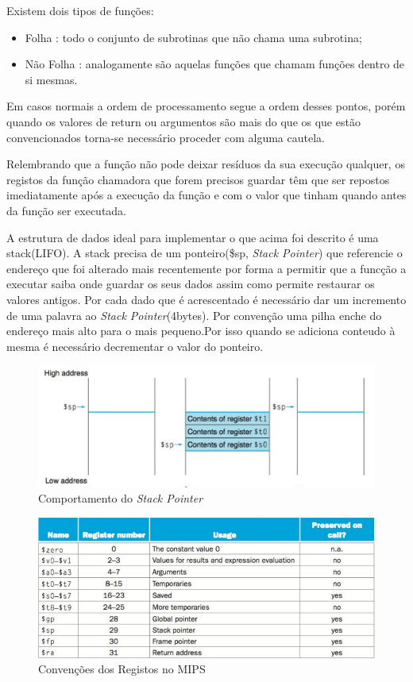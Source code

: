 \documentclass[10pt,a4paper]{book}
\begin{document}
		Existem dois tipos de funções:
		 \begin{itemize}
		    \item Folha : todo o conjunto de subrotinas que não chama uma subrotina;
		    \item Não Folha : analogamente são aquelas funções que chamam funções dentro de si mesmas.
		 \end{itemize}

 		Em casos normais a ordem de processamento segue a ordem desses pontos, porém quando os
 		valores de return ou argumentos são mais do que os que estão convencionados torna-se
 		necessário proceder com alguma cautela.

 		Relembrando que a função não pode deixar resíduos da sua execução qualquer, os registos
 		da função chamadora que forem precisos guardar têm que ser repostos imediatamente após a
 		 execução da função e com o valor que tinham quando antes da função ser executada.

 		A estrutura de dados ideal para implementar o que acima foi descrito é uma stack(LIFO).
 		A stack precisa de um ponteiro(\$sp, \textit{Stack Pointer}) que referencie o endereço que foi alterado mais recentemente por forma a permitir que a funcção a executar saiba onde guardar os seus dados assim como permite restaurar os valores antigos.
 		Por cada dado que é acrescentado é necessário dar um incremento de uma palavra ao \textit{Stack Pointer}(4bytes).
 		Por convenção uma pilha enche do endereço mais alto para o mais pequeno.Por isso quando se adiciona conteudo à mesma é necessário decrementar o valor do ponteiro.


 		\begin{figure}[htp]
	    	\centering
	    	\includegraphics[scale=0.6]{stack1.png}
	    	\caption{Comportamento do \textit{Stack Pointer}}
	    	\label{stack 1}
		\end{figure}


 		\begin{figure}[htp]
	    	\centering
	    	\includegraphics[scale=0.6]{registerconvention.png}
	    	\caption{Convenções dos Registos no MIPS}
	    	\label{conventions}
		\end{figure}
\end{document}
